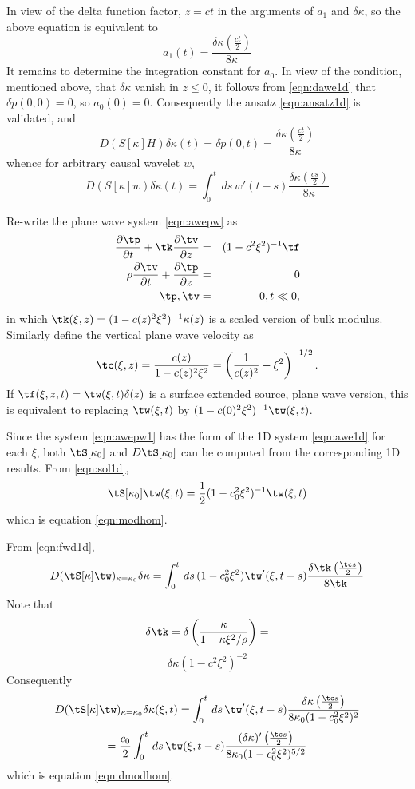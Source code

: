 In view of the delta function factor, $z=ct$ in the arguments of $a_1$
and $\delta \kappa $, so the above equation is equivalent to
\begin{equation}
\label{eqn:asol}
a_1(t)=\frac{\delta \kappa\left(\frac{ct}{2}\right)}{8\kappa}
\end{equation}
It remains to determine the integration constant for $a_0$. In view of
the condition, mentioned above, that $\delta \kappa$ vanish in $z \le
0$, it follows from \ref{eqn:dawe1d} that $\delta p(0,0)=0$, so
$a_0(0)=0$. Consequently the ansatz \ref{eqn:ansatz1d} is validated,
and 
\begin{equation}
\label{eqn:imp1d}
D(S[\kappa]H)\delta \kappa (t) = \delta p(0,t)=  \frac{\delta 
  \kappa\left(\frac{ct}{2}\right)}{8\kappa} 
\end{equation}
whence for arbitrary causal wavelet $w$,
\begin{equation}
\label{eqn:fwd1d}
D(S[\kappa]w)\delta \kappa (t) = \int_0^t\,ds\,w'(t-s)\frac{\delta 
  \kappa\left(\frac{cs}{2}\right)}{8\kappa} 
\end{equation}

Re-write the plane wave system \ref{eqn:awepw} as
\begin{eqnarray}
\label{eqn:awepw1}
\frac{\partial \tp}{\partial t} + \tk\frac{\partial
  \tv}{\partial z} &=& (1-c^2\xi^2)^{-1}\tf \nonumber\\
\rho \frac{\partial \tv}{\partial t} + \frac{\partial \tp}{\partial
  z}&=&0\nonumber\\
\tp,\tv&=&0, t \ll 0,
\end{eqnarray}
in which $\tk(\xi,z)=(1-c(z)^2\xi^2)^{-1}\kappa(z)$ is a scaled version of
bulk modulus. Similarly define the vertical plane wave velocity as
\[
\tc(\xi,z)=\frac{c(z)}{1-c(z)^2\xi^2} =
\left(\frac{1}{c(z)^2}-\xi^2\right)^{-1/2}.
\]
If $\tf(\xi,z,t)=\tw(\xi,t)\delta(z)$ is a surface
extended source, plane wave version, this is equivalent to replacing
$\tw(\xi,t)$ by $(1-c(0)^2\xi^2)^{-1}\tw(\xi,t)$.

Since the system \ref{eqn:awepw1} has the form of the 1D system
\ref{eqn:awe1d} for each $\xi $, both $\tS[\kappa_0] $ and
$D\tS[\kappa_0]$ can be computed from the corresponding 1D
results. From \ref{eqn:sol1d},
\[
\tS[\kappa_0]\tw(\xi,t)=\frac{1}{2}(1-c_0^2\xi^2)^{-1}\tw(\xi,t)
\]
which is equation \ref{eqn:modhom}.

From \ref{eqn:fwd1d},
\[
D(\tS[\kappa]\tw)_{\kappa=\kappa_0}\delta \kappa = \int_0^t\,ds\,(1-c_0^2\xi^2)\tw'(\xi,t-s)\frac{\delta 
  \tk \left(\frac{\tc s}{2}\right)}{8\tk} 
\]
Note that 
\[
\delta \tk = \delta \left(\frac{\kappa}{1-\kappa \xi^2/\rho}\right) = 
\]
\[
\delta \kappa (1-c^2\xi^2)^{-2}
\]
Consequently 
\[
D(\tS[\kappa]\tw)_{\kappa=\kappa_0}\delta \kappa(\xi,t) =
\int_0^t\,ds\,\tw'(\xi,t-s)\frac{\delta \kappa  \left(\frac{\tc 
      s}{2}\right)}{8\kappa_0 (1-c_0^2\xi^2)^2} 
\]
\[
= \frac{c_0}{2}\int_0^t\,ds\,\tw(\xi,t-s)\frac{(\delta \kappa)'  \left(\frac{\tc 
      s}{2}\right)}{8\kappa_0 (1-c_0^2\xi^2)^{5/2}} 
\]
which is equation \ref{eqn:dmodhom}.


